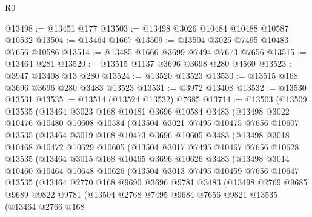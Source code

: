 \begin{lexlean}{R0}
\begin{coremodule}
@13498 := @13451 @177
@13503 := @13498 @3026 @10484 @10488 @10587 @10532
@13504 := @13464 @1667
@13509 := @13504 @3025 @7495 @10483 @7656 @10586
@13514 := @13485 @1666 @3699 @7494 @7673 @7656
@13515 := @13464 @281
@13520 := @13515 @1137 @3696 @3698 @280 @4560
@13523 := @3947 @13408 @13 @280
@13524 := @13520 @13523
@13530 := @13515 @168 @3696 @3696 @280 @3483 @13523
@13531 := @3972 @13408
@13532 := @13530 @13531
@13535 := @13514 (@13524 @13532) @7685
@13714 := @13503
    (@13509
      @13535
      (@13464
        @3023
        @168
        @10481
        @3696
        @10584
        @3483
        (@13498
          @3022
          @10476
          @10480
          @10608
          @10584
          (@13504
            @3021
            @7495
            @10475
            @7656
            @10607
            @13535
            (@13464
              @3019
              @168
              @10473
              @3696
              @10605
              @3483
              (@13498
                @3018
                @10468
                @10472
                @10629
                @10605
                (@13504
                  @3017
                  @7495
                  @10467
                  @7656
                  @10628
                  @13535
                  (@13464
                    @3015
                    @168
                    @10465
                    @3696
                    @10626
                    @3483
                    (@13498
                      @3014
                      @10460
                      @10464
                      @10648
                      @10626
                      (@13504
                        @3013
                        @7495
                        @10459
                        @7656
                        @10647
                        @13535
                        (@13464
                          @2770
                          @168
                          @9690
                          @3696
                          @9781
                          @3483
                          (@13498
                            @2769
                            @9685
                            @9689
                            @9822
                            @9781
                            (@13504
                              @2768
                              @7495
                              @9684
                              @7656
                              @9821
                              @13535
                              (@13464
                                @2766
                                @168

\end{coremodule}
\end{lexlean}
